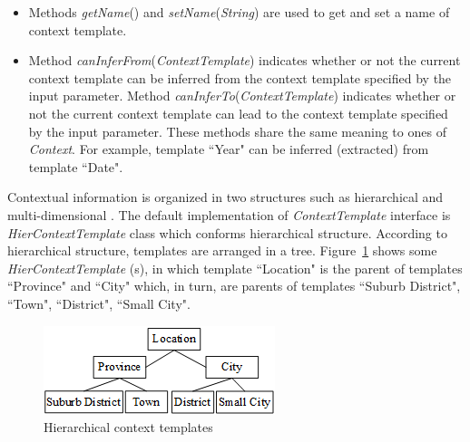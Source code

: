 \documentclass[a4paper,twoside]{article}
\begin{document}
\begin{itemize}
\item Methods \textit{getName}() and \textit{setName}(\textit{String}) are used to get and set a name of context template.
\item Method \textit{canInferFrom}(\textit{ContextTemplate}) indicates whether or not the current context template can be inferred from the context template specified by the input parameter. Method \textit{canInferTo}(\textit{ContextTemplate}) indicates whether or not the current context template can lead to the context template specified by the input parameter. These methods share the same meaning to ones of \textit{Context}. For example, template ``Year" can be inferred (extracted) from template ``Date".
\end{itemize}
Contextual information is organized in two structures such as hierarchical and multi-dimensional \cite[pp. 225-228]{ricci2011}. The default implementation of \textit{ContextTemplate} interface is \textit{HierContextTemplate} class which conforms hierarchical structure. According to hierarchical structure, templates are arranged in a tree. Figure~\ref{figure:hierarchical-structure} shows some \textit{HierContextTemplate} (s), in which template ``Location" is the parent of templates ``Province" and ``City" which, in turn, are parents of templates ``Suburb District", ``Town", ``District", ``Small City".
\begin{figure}
\centering
\includegraphics{HierarchicalStructure.png}
\caption{Hierarchical context templates}
\label{figure:hierarchical-structure}
\end{figure}
\end{document}
